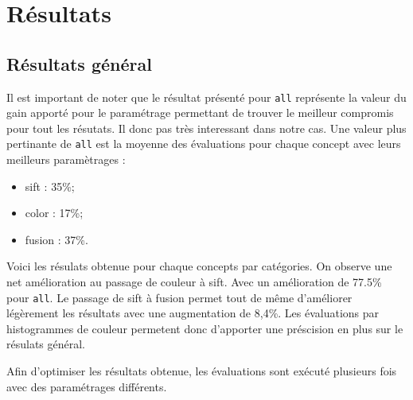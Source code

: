 \documentclass[a4paper, 11pt]{article}
\begin{document}
\section{Résultats}
\subsection{Résultats général}
Il est important de noter que le résultat présenté pour \texttt{all} représente la valeur du gain apporté pour le paramétrage permettant de trouver le meilleur compromis pour tout les résutats. Il donc pas très interessant dans notre cas. Une valeur plus pertinante de \texttt{all} est la moyenne des évaluations pour chaque concept avec leurs meilleurs paramètrages : 
\begin{itemize}
	\item sift  : 35\%;
	\item color : 17\%;
	\item fusion : 37\%.
\end{itemize}

\begin{center}
\end{center}

Voici les résulats obtenue pour chaque concepts par catégories. On observe une net amélioration au passage de couleur à sift. Avec un amélioration de 77.5\% pour \texttt{all}. Le passage de sift à fusion permet tout de même d'améliorer légèrement les résultats avec une augmentation de 8,4\%. Les évaluations par histogrammes de couleur permetent donc d'apporter une préscision en plus sur le résulats général.

Afin d'optimiser les résultats obtenue, les évaluations sont exécuté plusieurs fois avec des paramétrages différents. 
\end{document}
